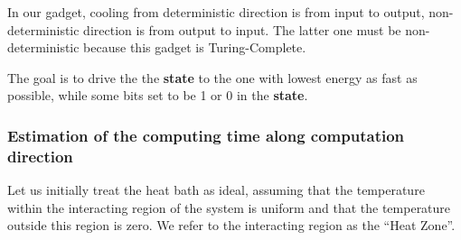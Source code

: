 \documentclass[twocolumn,superscriptaddress,english,showpacs,longbibliography]{revtex4-2}
\begin{document}





In our gadget, cooling from deterministic direction is from input to
output, non-deterministic direction is from output to input. The latter
one must be non-deterministic because this gadget is Turing-Complete.

The goal is to drive the the \textbf{state} to the one with lowest energy as fast as possible, while some bits set to be 1 or 0 in the \textbf{state}.

\subsubsection{Estimation of the computing time along computation direction}\label{estimation-of-the-computing-time}

Let us initially treat the heat bath as ideal, assuming that the temperature within the interacting region of the system is uniform and that the temperature outside this region is zero. We refer to the interacting region as the ``Heat Zone''.
\end{document}
